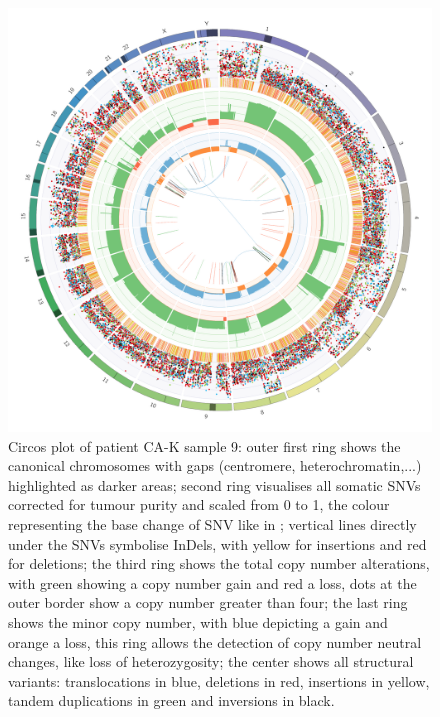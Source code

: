 \begin{figure}[ht]
\centering
\includegraphics[width=.99\linewidth]{Figures/CASCADE/CA82/CA82-9.circos.png}
\caption[Circos plot of patient CA-K sample 9]{Circos plot of patient CA-K sample 9: outer first ring shows the canonical chromosomes with gaps (centromere, heterochromatin,...) highlighted as darker areas; second ring visualises all somatic SNVs corrected for tumour purity and scaled from 0 to 1, the colour representing the base change of SNV like in \protect\textcite{Alexandrov2013}; vertical lines directly under the SNVs symbolise InDels, with yellow for insertions and red for deletions; the third ring shows the total copy number alterations, with green showing a copy number gain and red a loss, dots at the outer border show a copy number greater than four; the last ring shows the minor copy number, with blue depicting a gain and orange a loss, this ring allows the detection of copy number neutral changes, like loss of heterozygosity; the center shows all structural variants: translocations in blue, deletions in red, insertions in yellow, tandem duplications in green and inversions in black.} \label{fig:ca82.9circos}
\end{figure}

